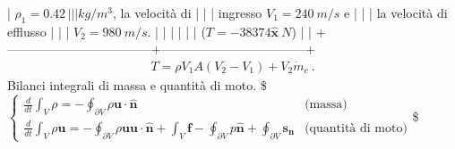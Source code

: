\documentclass[letterpaper,10pt,italian]{jupyterBook}
\begin{document}
|     \(\rho_1 = 0.42\,              |                                   |
|           kg/m^3\), la velocità di |                                   |
|     ingresso \(V_1 = 240\ m/s\) e   |                                   |
|     la velocità di efflusso       |                                   |
|     \(V_2 = 980\ m/s\).             |                                   |
|                                   |                                   |
| (\(T = -38374\hat{\bm{x}}\ N\))     |                                   |
+———————————–+———————————–+
\begin{equation*}
\begin{split}T = \rho V_1 A (V_2-V_1) + V_2 \dot{m}_c \ .\end{split}
\end{equation*}
\sphinxAtStartPar
Bilanci integrali di massa e quantità di moto. \$\(\begin{cases}
  \frac{d}{dt} \int_V \rho = -\oint_{\partial V} \rho \bm{u} \cdot \hat{\bm{n}}  & \text{(massa)} \\
  \frac{d}{dt} \int_V \rho \bm{u} = -\oint_{\partial V} \rho \bm{u} \bm{u} \cdot \hat{\bm{n}}
  +\int_V \bm{f} - \oint_{\partial V} p \hat{\bm{n}} + \oint_{\partial V} \bm{s_n} & \text{(quantità di moto)}
\end{cases}\)\$
\end{document}
